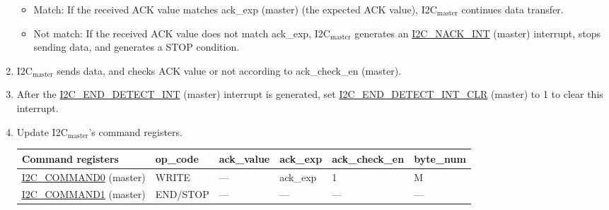 \documentclass[main\_\_EN.tex]{subfiles}
\begin{document}
\begin{enumerate}
\begin{itemize}
\item Match: If the received ACK value matches ack\_exp (master) (the expected ACK value), I2C$_\text{master}$ continues data transfer.
\item Not match: If the received ACK value does not match ack\_exp, I2C$_\text{master}$ generates an \hyperref[int:i2c-nack]{I2C\_NACK\_INT} (master) interrupt, stops sending data, and generates a STOP condition.
\end{itemize}

\item I2C$_\text{master}$ sends data, and checks ACK value or not according to ack\_check\_en (master).

\item After the \hyperref[int:i2c-end]{I2C\_END\_DETECT\_INT} (master) interrupt is generated, set \hyperref[fielddesc:I2CENDDETECTINTCLR]{I2C\_END\_DETECT\_INT\_CLR} (master) to 1 to clear this interrupt.
\item Update I2C$_\text{master}$'s command registers.

\vspace{1em}
\begin{longtable}{ | p{4.5cm} | p{1.8cm} | p{1.8cm} | p{1.8cm} |p{2.2cm} | p{1.8cm}|}
\hline\rowcolor{lightgray}
Command registers& op\_code & ack\_value&ack\_exp&ack\_check\_en&byte\_num  \\ \hline
\hyperref[fielddesc:I2CCOMMAND0]{I2C\_COMMAND0} (master)& WRITE& ---&ack\_exp&1&M  \\ \hline
\hyperref[fielddesc:I2CCOMMAND1]{I2C\_COMMAND1} (master)& END/STOP& ---&---&---&---  \\ \hline
\end{longtable}


\end{enumerate}
\end{document}
